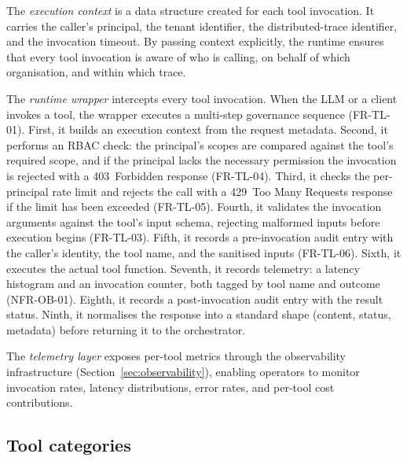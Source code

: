 \documentclass[a4paper,noexaminfo]{sapthesis}
\begin{document}
The \emph{execution context} is a data structure created for each tool
invocation.  It carries the caller's principal, the tenant identifier, the
distributed-trace identifier, and the invocation timeout.  By passing
context explicitly, the runtime ensures that every tool invocation is
aware of who is calling, on behalf of which organisation, and within which
trace.

The \emph{runtime wrapper} intercepts every tool invocation.
When the LLM or a client invokes a tool, the wrapper executes a
multi-step governance sequence (FR-TL-01).  First, it builds an execution context from
the request metadata.  Second, it performs an RBAC check: the principal's
scopes are compared against the tool's required scope, and if the
principal lacks the necessary permission the invocation is rejected with a
403~Forbidden response (FR-TL-04).  Third, it checks the per-principal
rate limit and rejects the call with a 429~Too Many Requests response if
the limit has been exceeded (FR-TL-05).  Fourth, it validates the
invocation arguments against the tool's input schema, rejecting malformed
inputs before execution begins (FR-TL-03).  Fifth, it records a
pre-invocation audit entry with the caller's identity, the tool name, and
the sanitised inputs (FR-TL-06).  Sixth, it executes the actual tool
function.  Seventh, it records telemetry: a latency histogram and an
invocation counter, both tagged by tool name and outcome (NFR-OB-01).
Eighth, it records a post-invocation audit entry with the result status.
Ninth, it normalises the response into a standard shape (content, status,
metadata) before returning it to the orchestrator.

The \emph{telemetry layer} exposes per-tool metrics through the
observability infrastructure (Section~\ref{sec:observability}), enabling
operators to monitor invocation rates, latency distributions, error rates,
and per-tool cost contributions.

\subsection{Tool categories}
\end{document}
